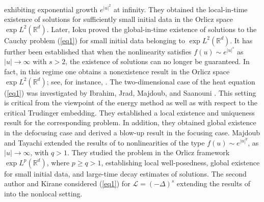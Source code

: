 \documentclass[a4paper,11pt]{amsart}
\renewcommand\eqref[1]{(\ref{#1})} %
\numberwithin{equation}{section}
\theoremstyle{plain}
\theoremstyle{definition}
\begin{document}
exhibiting exponential growth $e^{|u|^2}$ at infinity. They obtained the local-in-time existence of 
solutions for sufficiently small initial data in the Orlicz space 
$\exp L^{2}(\mathbb{R}^{d})$. Later, Ioku \cite{Ioku2011} proved the global-in-time existence 
of solutions to the Cauchy problem \eqref{eq1} for small initial data belonging to 
$\exp L^{2}(\mathbb{R}^{d})$. It has further been established that when the nonlinearity satisfies 
$f(u) \sim e^{|u|^{s}}$ as $|u| \to \infty$ with $s>2$, the existence of 
solutions can no longer be guaranteed. In fact, in this regime one obtains 
a nonexistence result in the Orlicz space $\exp L^{2}(\mathbb{R}^{d})$; 
see, for instance, \cite{Ioku}. The two-dimensional case of the heat equation \eqref{eq1} was investigated by 
Ibrahim, Jrad, Majdoub, and Saanouni \cite{Ibrahim1}. This setting is critical 
from the viewpoint of the energy method as well as with respect to the 
critical Trudinger embedding. They established a local existence and uniqueness 
result for the corresponding problem. In addition, they obtained global 
existence in the defocusing case and derived a blow-up result in the focusing case. Majdoub and Tayachi \cite{Majdoub2,Majdoub3} extended the results of 
\cite{Ioku,Ioku2011} to nonlinearities of the type 
$f(u) \sim e^{|u|^{q}}$, as $|u|\to\infty$, with $q>1$. 
They studied the problem in the Orlicz framework 
$\exp L^{p}(\mathbb{R}^{d})$, where $p \ge q > 1$, 
establishing local well-posedness, global existence for small initial data, 
and large-time decay estimates of solutions. The second author and Kirane \cite{FK20} considered \eqref{eq1} for $\mathcal{L}=(-\Delta)^s$ extending the results of \cite{Majdoub2,Majdoub3} into the nonlocal setting. 
\end{document}
